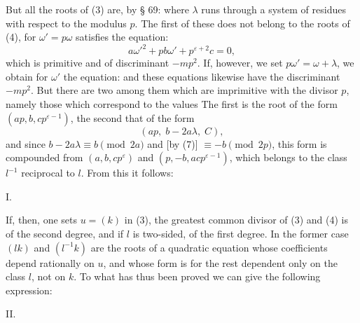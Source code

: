 But all the roots of (3) are, by § 69:
where $\lambda$ runs through a system of residues with respect to the
modulus $p$. The first of these does not belong to the roots of (4), for
$\omega' = p\omega$ satisfies the equation:
\[
a\omega'^2 + p b \omega' + p^{\varepsilon+2} c = 0,
\]
which is primitive and of discriminant $-mp^2$. If, however, we set
$p\omega' = \omega + \lambda$, we obtain for $\omega'$ the equation:
and these equations likewise have the discriminant
$-mp^2$. But there are two among them which are imprimitive with the
divisor $p$, namely those which correspond to the values
The first is the root of the form $(a p, b, c p^{\varepsilon-1})$, the
second that of the form
\[
(a p, \; b - 2a\lambda, \; C),
\]
and since $b - 2a\lambda \equiv b \pmod{2a}$ and [by (7)] $\equiv -b \pmod{2p}$,
this form is compounded from $(a, b, c p^{\varepsilon})$ and $(p, -b, a c p^{\varepsilon-1})$,
which belongs to the class $l^{-1}$ reciprocal to $l$. From this it follows:

I. 

If, then, one sets $u = (k)$ in (3), the greatest common
 divisor of (3) and (4) is of the second degree, and if $l$
is two-sided, of the first degree. In the former case $(lk)$ and
$(l^{-1}k)$ are the roots of a quadratic equation whose coefficients
 depend rationally on $u$, and whose form is for the rest
dependent only on the class $l$, not on $k$. To what has thus
been proved we can give the following expression:

II. 
